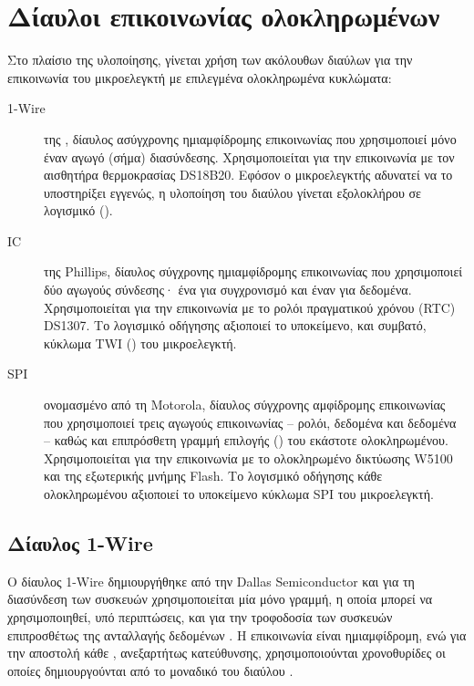 \section{Δίαυλοι επικοινωνίας ολοκληρωμένων}
\label{sec:buses}

Στο πλαίσιο της υλοποίησης, γίνεται χρήση των ακόλουθων διαύλων για την
επικοινωνία του μικροελεγκτή με επιλεγμένα ολοκληρωμένα κυκλώματα:
\begin{description}
    \item[1-Wire] της , δίαυλος ασύγχρονης
    ημιαμφίδρομης επικοινωνίας που χρησιμοποιεί μόνο έναν αγωγό (σήμα)
    διασύνδεσης. Χρησιμοποιείται για την επικοινωνία με τον αισθητήρα
    θερμοκρασίας DS18B20. Εφόσον ο μικροελεγκτής αδυνατεί να το υποστηρίξει
    εγγενώς, η υλοποίηση του διαύλου γίνεται εξολοκλήρου σε λογισμικό
    ().

    \item[I\protect{}C] της Phillips, δίαυλος σύγχρονης ημιαμφίδρομης
    επικοινωνίας που χρησιμοποιεί δύο αγωγούς σύνδεσης· ένα για συγχρονισμό και
    έναν για δεδομένα. Χρησιμοποιείται για την επικοινωνία με το ρολόι
    πραγματικού χρόνου (RTC) DS1307. Το λογισμικό οδήγησης αξιοποιεί το
    υποκείμενο, και συμβατό, κύκλωμα TWI () του
    μικροελεγκτή.

    \item[SPI] ονομασμένο από τη Motorola, δίαυλος σύγχρονης αμφίδρομης
    επικοινωνίας που χρησιμοποιεί τρεις αγωγούς επικοινωνίας -- ρολόι, δεδομένα
     και δεδομένα  -- καθώς και επιπρόσθετη γραμμή επιλογής
    () του εκάστοτε ολοκληρωμένου. Χρησιμοποιείται για την επικοινωνία
    με το ολοκληρωμένο δικτύωσης W5100 και της εξωτερικής μνήμης Flash. Το
    λογισμικό οδήγησης κάθε ολοκληρωμένου αξιοποιεί το υποκείμενο κύκλωμα SPI
    του μικροελεγκτή.
\end{description}

\subsection{Δίαυλος 1-Wire}
\label{subsec:1-wire}

Ο δίαυλος 1-Wire δημιουργήθηκε από την Dallas Semiconductor και για τη
διασύνδεση των συσκευών χρησιμοποιείται μία μόνο γραμμή, η οποία μπορεί να
χρησιμοποιηθεί, υπό περιπτώσεις, και για την τροφοδοσία των συσκευών
επιπροσθέτως της ανταλλαγής δεδομένων \parencite[1]{atmel04}. Η επικοινωνία
είναι ημιαμφίδρομη, ενώ για την αποστολή κάθε , ανεξαρτήτως κατεύθυνσης,
χρησιμοποιούνται χρονοθυρίδες οι οποίες δημιουργούνται από το μοναδικό
 του διαύλου \parencites[2]{atmel04}[15]{ds18b20}.

